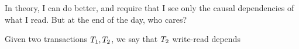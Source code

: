 \ac{In theory, I can do better, and require that I see only the causal dependencies 
of what I read. But at the end of the day, who cares?}

Given two transactions $T_1, T_2$, we say that $T_2$ write-read depends 
%

